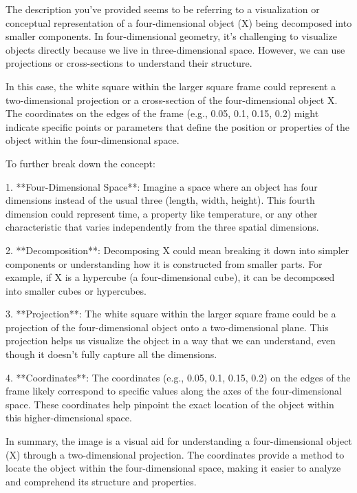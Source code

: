 The description you've provided seems to be referring to a visualization or conceptual representation of a four-dimensional object (X) being decomposed into smaller components. In four-dimensional geometry, it's challenging to visualize objects directly because we live in three-dimensional space. However, we can use projections or cross-sections to understand their structure.

In this case, the white square within the larger square frame could represent a two-dimensional projection or a cross-section of the four-dimensional object X. The coordinates on the edges of the frame (e.g., 0.05, 0.1, 0.15, 0.2) might indicate specific points or parameters that define the position or properties of the object within the four-dimensional space.

To further break down the concept:

1. **Four-Dimensional Space**: Imagine a space where an object has four dimensions instead of the usual three (length, width, height). This fourth dimension could represent time, a property like temperature, or any other characteristic that varies independently from the three spatial dimensions.

2. **Decomposition**: Decomposing X could mean breaking it down into simpler components or understanding how it is constructed from smaller parts. For example, if X is a hypercube (a four-dimensional cube), it can be decomposed into smaller cubes or hypercubes.

3. **Projection**: The white square within the larger square frame could be a projection of the four-dimensional object onto a two-dimensional plane. This projection helps us visualize the object in a way that we can understand, even though it doesn't fully capture all the dimensions.

4. **Coordinates**: The coordinates (e.g., 0.05, 0.1, 0.15, 0.2) on the edges of the frame likely correspond to specific values along the axes of the four-dimensional space. These coordinates help pinpoint the exact location of the object within this higher-dimensional space.

In summary, the image is a visual aid for understanding a four-dimensional object (X) through a two-dimensional projection. The coordinates provide a method to locate the object within the four-dimensional space, making it easier to analyze and comprehend its structure and properties.